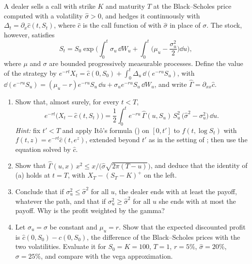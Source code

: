 \begin{exercise}\label{ex:dh-robust}
\hard A dealer sells a call with strike $K$ and maturity $T$ at the Black--Scholes price
computed with a volatility $\hat\sigma>0$, and hedges it continuously with
$\Delta_t=\partial_x\hat c(t,S_t)$, where $\hat c$ is the call function of 
with $\hat\sigma$ in place of $\sigma$. The stock, however, satisfies
\[
  S_t=S_0\exp\Big(\int_0^t\sigma_u\,\dd W_u+\int_0^t\Big(\mu_u-\frac{\sigma_u^2}{2}\Big)\dd u\Big),
\]
where $\mu$ and $\sigma$ are bounded progressively measurable processes. Define the value of the
strategy by $e^{-rt}X_t=\hat c(0,S_0)+\int_0^t\Delta_u\,\dd(e^{-ru}S_u)$, with
$\dd(e^{-ru}S_u)=(\mu_u-r)e^{-ru}S_u\,\dd u+\sigma_ue^{-ru}S_u\,\dd W_u$, and write
$\hat\Gamma=\partial_{xx}\hat c$.
\begin{enumerate}[label=(\alph*)]
  \item Show that, almost surely, for every $t<T$,
    \[
      e^{-rt}\big(X_t-\hat c(t,S_t)\big)=\frac12\int_0^te^{-ru}\,\hat\Gamma(u,S_u)\,S_u^2\,\big(\hat\sigma^2-\sigma_u^2\big)\,\dd u .
    \]
    \emph{Hint:} fix $t'<T$ and apply It\^o's formula () on $[0,t']$ to
    $f(t,\log S_t)$ with $f(t,z)=e^{-rt}\hat c(t,e^z)$, extended beyond $t'$ as in the setting of
    ; then use the equation solved by $\hat c$.
  \item Show that $\hat\Gamma(u,x)\,x^2\le x/\big(\hat\sigma\sqrt{2\pi(T-u)}\big)$, and deduce that the
    identity of (a) holds at $t=T$, with $X_T-(S_T-K)^+$ on the left.
  \item Conclude that if $\sigma_u^2\le\hat\sigma^2$ for all $u$, the dealer ends with at least the
    payoff, whatever the path, and that if $\sigma_u^2\ge\hat\sigma^2$ for all $u$ she ends with at
    most the payoff. Why is the profit weighted by the gamma?
  \item Let $\sigma_u=\sigma$ be constant and $\mu_u=r$. Show that the expected discounted profit
    is $\hat c(0,S_0)-c(0,S_0)$, the difference of the Black--Scholes prices with the two
    volatilities. Evaluate it for $S_0=K=100$, $T=1$, $r=5\%$, $\hat\sigma=20\%$, $\sigma=25\%$, and
    compare with the vega approximation.
\end{enumerate}
\end{exercise}

